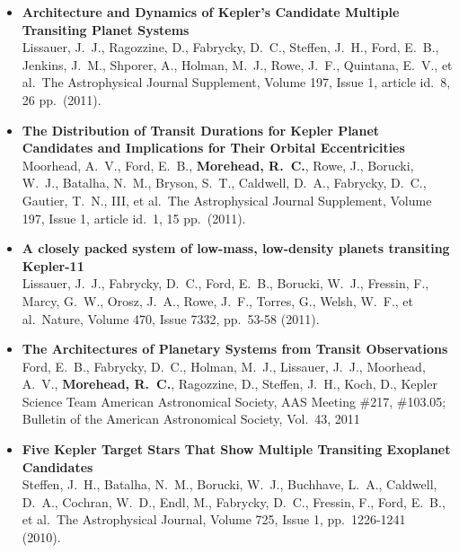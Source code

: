 \documentclass[11pt,letterpaper,sans]{moderncv} %
\begin{document}
\begin{itemize}
 \item \textbf{ Architecture and Dynamics of Kepler's Candidate Multiple 
Transiting Planet Systems } \\ Lissauer, J.~J., Ragozzine, D., Fabrycky, 
D.~C., Steffen, J.~H., Ford, E.~B., Jenkins, J.~M., Shporer, A., Holman, 
M.~J., Rowe, J.~F., Quintana, E.~V., et al.\ The Astrophysical Journal 
Supplement, Volume 197, Issue 1, article id.~8, 26 pp.~(2011).\ \\ 

 \item \textbf{ The Distribution of Transit Durations for Kepler Planet 
Candidates and Implications for Their Orbital Eccentricities } \\ Moorhead, 
A.~V., Ford, E.~B., \textbf{Morehead, R.~C.}, Rowe, J., Borucki, W.~J., Batalha, 
N.~M., Bryson, S.~T., Caldwell, D.~A., Fabrycky, D.~C., Gautier, T.~N., 
III, et al.\ The Astrophysical Journal Supplement, Volume 197, Issue 1, 
article id.~1, 15 pp.~(2011).\ \\ 

 \item \textbf{ A closely packed system of low-mass, low-density planets 
transiting Kepler-11 } \\ Lissauer, J.~J., Fabrycky, D.~C., Ford, E.~B., 
Borucki, W.~J., Fressin, F., Marcy, G.~W., Orosz, J.~A., Rowe, J.~F., 
Torres, G., Welsh, W.~F., et al.\ Nature, Volume 470, Issue 7332, pp.~53-58 
(2011).\ \\ 


 \item \textbf{ The Architectures of Planetary Systems from Transit 
Observations } \\ Ford, E.~B., Fabrycky, D.~C., Holman, M.~J., Lissauer, 
J.~J., Moorhead, A.~V., \textbf{Morehead, R.~C.}, Ragozzine, D., Steffen, J.~H., 
Koch, D., Kepler Science Team American Astronomical Society, AAS Meeting 
\#217, \#103.05; Bulletin of the American Astronomical Society, Vol.~43, 
2011 \\ 

 \item \textbf{ Five Kepler Target Stars That Show Multiple Transiting 
Exoplanet Candidates } \\ Steffen, J.~H., Batalha, N.~M., Borucki, W.~J., 
Buchhave, L.~A., Caldwell, D.~A., Cochran, W.~D., Endl, M., Fabrycky, 
D.~C., Fressin, F., Ford, E.~B., et al.\ The Astrophysical Journal, Volume 
725, Issue 1, pp.~1226-1241 (2010).\ \\ 


\end{itemize}
\end{document}
